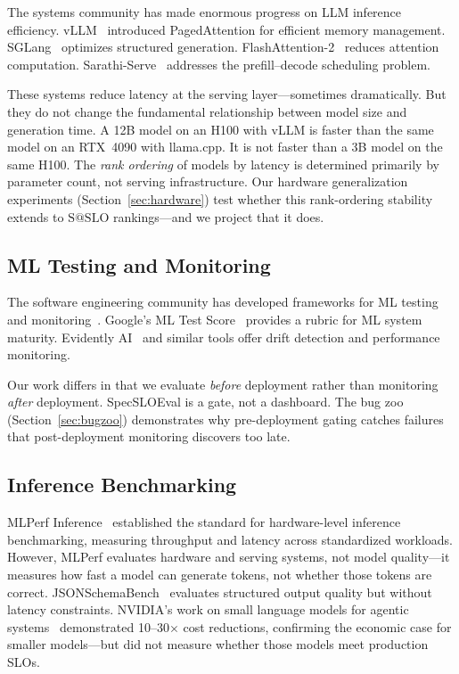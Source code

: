 \documentclass[11pt]{article}
\makeatletter
\newcommand{\sslo}{\ensuremath{\mathrm{S@SLO}}}
\makeatother
\begin{document}
The systems community has made enormous progress on LLM inference efficiency. vLLM~\cite{kwon2023vllm} introduced PagedAttention for efficient memory management. SGLang~\cite{zheng2023sglang} optimizes structured generation. FlashAttention-2~\cite{dao2023flashattention2} reduces attention computation. Sarathi-Serve~\cite{agrawal2024sarathi} addresses the prefill--decode scheduling problem.

These systems reduce latency at the serving layer---sometimes dramatically. But they do not change the fundamental relationship between model size and generation time. A 12B model on an H100 with vLLM is faster than the same model on an RTX~4090 with llama.cpp. It is not faster than a 3B model on the same H100. The \emph{rank ordering} of models by latency is determined primarily by parameter count, not serving infrastructure. Our hardware generalization experiments (Section~\ref{sec:hardware}) test whether this rank-ordering stability extends to $\sslo{}$ rankings---and we project that it does.

\subsection{ML Testing and Monitoring}

The software engineering community has developed frameworks for ML testing~\cite{breck2017ml} and monitoring~\cite{klaise2020monitoring}. Google's ML Test Score~\cite{breck2017ml} provides a rubric for ML system maturity. Evidently AI~\cite{evidentlyai} and similar tools offer drift detection and performance monitoring.

Our work differs in that we evaluate \emph{before} deployment rather than monitoring \emph{after} deployment. SpecSLOEval is a gate, not a dashboard. The bug zoo (Section~\ref{sec:bugzoo}) demonstrates why pre-deployment gating catches failures that post-deployment monitoring discovers too late.

\subsection{Inference Benchmarking}

MLPerf Inference~\cite{reddi2020mlperf} established the standard for hardware-level inference benchmarking, measuring throughput and latency across standardized workloads. However, MLPerf evaluates hardware and serving systems, not model quality---it measures how fast a model can generate tokens, not whether those tokens are correct. JSONSchemaBench~\cite{geng2025jsonschemabench} evaluates structured output quality but without latency constraints. NVIDIA's work on small language models for agentic systems~\cite{nvidia2025slm} demonstrated 10--30$\times$ cost reductions, confirming the economic case for smaller models---but did not measure whether those models meet production SLOs.
\end{document}
